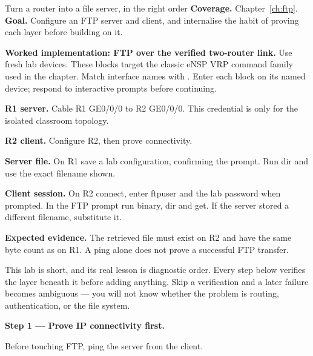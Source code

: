 
\begin{labproject}{Turn a router into a file server, in the right order}
\textbf{Coverage.} Chapter~\ref{ch:ftp}.\\
\textbf{Goal.} Configure an FTP server and client, and internalise the habit of proving each layer before building on it.



\noindent\textbf{Worked implementation: FTP over the verified two-router link.}
Use fresh lab devices. These blocks target the classic eNSP VRP command family used in the chapter. Match interface names with . Enter each block on its named device; respond to interactive prompts before continuing.

\noindent\textbf{R1 server.} Cable R1 GE0/0/0 to R2 GE0/0/0. This credential is only for the isolated classroom topology.


\noindent\textbf{R2 client.} Configure R2, then prove connectivity.


\noindent\textbf{Server file.} On R1 save a lab configuration, confirming the prompt. Run dir and use the exact filename shown.


\noindent\textbf{Client session.} On R2 connect, enter ftpuser and the lab password when prompted. In the FTP prompt run binary, dir and get. If the server stored a different filename, substitute it.


\textbf{Expected evidence.} The retrieved file must exist on R2 and have the same byte count as on R1. A ping alone does not prove a successful FTP transfer.




\begin{labmode}
This lab is short, and its real lesson is diagnostic order. Every step below verifies the layer beneath it before adding anything. Skip a verification and a later failure becomes ambiguous --- you will not know whether the problem is routing, authentication, or the file system.
\end{labmode}

\medskip\noindent\textbf{Step 1 --- Prove IP connectivity first.}\par
Before touching FTP, ping the server from the client.


\end{labproject}
